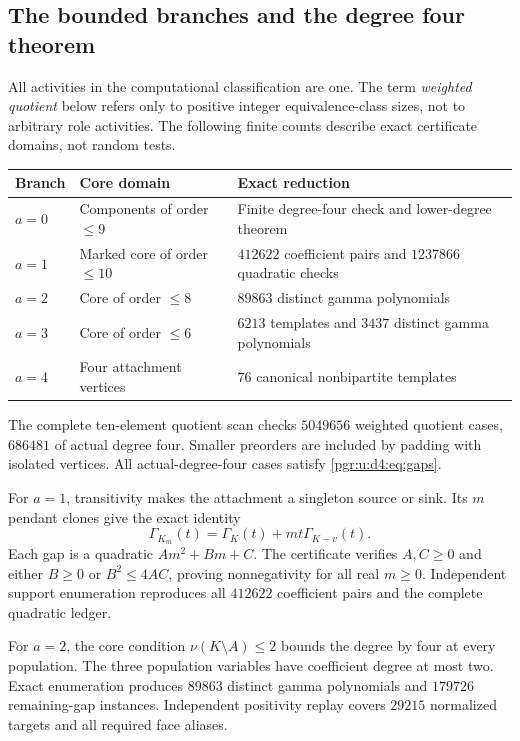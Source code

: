 \documentclass[11pt]{article}
\numberwithin{equation}{section}
\theoremstyle{definition}\newtheorem{definition}[theorem]{Definition}\newtheorem{remark}[theorem]{Remark}
\newcommand{\Ga}{\Gamma}                   %
\begin{document}
\subsection{The bounded branches and the degree four theorem}
All activities in the computational classification are one. The term \emph{weighted quotient} below refers only to positive integer equivalence-class sizes, not to arbitrary role activities. The following finite counts describe exact certificate domains, not random tests.
\begin{center}\small
\begin{tabular}{p{24mm}p{36mm}p{82mm}}
\toprule
Branch & Core domain & Exact reduction\\\midrule
$a=0$ & Components of order $\le9$ & Finite degree-four check and lower-degree theorem\\
$a=1$ & Marked core of order $\le10$ & $412622$ coefficient pairs and $1237866$ quadratic checks\\
$a=2$ & Core of order $\le8$ & $89863$ distinct gamma polynomials\\
$a=3$ & Core of order $\le6$ & $6213$ templates and $3437$ distinct gamma polynomials\\
$a=4$ & Four attachment vertices & $76$ canonical nonbipartite templates\\\bottomrule
\end{tabular}
\end{center}
The complete ten-element quotient scan checks $5049656$ weighted quotient cases, $686481$ of actual degree four. Smaller preorders are included by padding with isolated vertices. All actual-degree-four cases satisfy \eqref{pgr:u:d4:eq:gaps}.

For $a=1$, transitivity makes the attachment a singleton source or sink. Its $m$ pendant clones give the exact identity
\[
 \Ga_{K_m}(t)=\Ga_K(t)+mt\Ga_{K-v}(t).
\]
Each gap is a quadratic $A m^2+B m+C$. The certificate verifies $A,C\ge0$ and either $B\ge0$ or $B^2\le4AC$, proving nonnegativity for all real $m\ge0$. Independent support enumeration reproduces all $412622$ coefficient pairs and the complete quadratic ledger.

For $a=2$, the core condition $\nu(K\setminus A)\le2$ bounds the degree by four at every population. The three population variables have coefficient degree at most two. Exact enumeration produces $89863$ distinct gamma polynomials and $179726$ remaining-gap instances. Independent positivity replay covers $29215$ normalized targets and all required face aliases.
\end{document}
